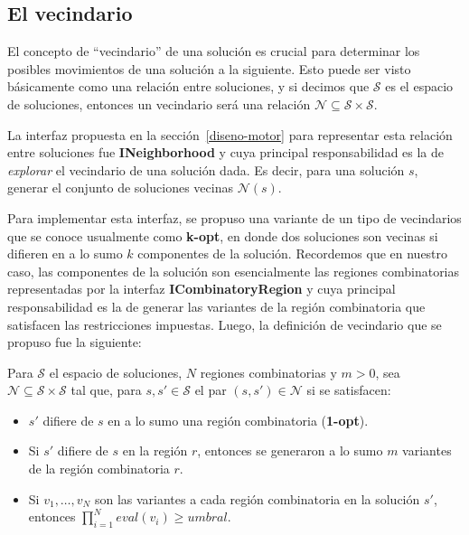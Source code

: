 \subsection{El vecindario}

El concepto de ``vecindario'' de una soluci\'on es crucial para determinar los
posibles movimientos de una soluci\'on a la siguiente. Esto puede ser visto
b\'asicamente como una relaci\'on entre soluciones, y si decimos que
$\mathcal{S}$ es el espacio de soluciones, entonces un vecindario ser\'a una
relaci\'on $\mathcal{N} \subseteq \mathcal{S} \times \mathcal{S}$.

La interfaz propuesta en la secci\'on~\ref{diseno-motor} para representar esta
relaci\'on entre soluciones fue \textbf{INeighborhood} y cuya principal
responsabilidad es la de \textit{explorar} el vecindario de una soluci\'on dada.
Es decir, para una soluci\'on $s$, generar el conjunto de soluciones vecinas
$\mathcal{N}(s)$. 

Para implementar esta interfaz, se propuso una variante de un tipo de
vecindarios que se conoce usualmente como \textbf{k-opt}, en donde dos
soluciones son vecinas si difieren en a lo sumo $k$ componentes de la
soluci\'on. Recordemos que en nuestro caso, las componentes de la soluci\'on son
esencialmente las regiones combinatorias representadas por la interfaz
\textbf{ICombinatoryRegion} y cuya principal responsabilidad es la de generar
las variantes de la regi\'on combinatoria que satisfacen las restricciones
impuestas. Luego, la definici\'on de vecindario que se propuso fue la siguiente:

\begin{definition}
 Para $\mathcal{S}$ el espacio de soluciones, $N$ regiones combinatorias y
$m>0$, sea $\mathcal{N} \subseteq \mathcal{S} \times \mathcal{S}$ tal que,
para $s, s' \in \mathcal{S}$ el par $(s,s') \in \mathcal{N}$ si se satisfacen:
\begin{itemize}
 \item $s'$ difiere de $s$ en a lo sumo una regi\'on combinatoria
(\textbf{1-opt}).
 \item Si $s'$ difiere de $s$ en la regi\'on $r$, entonces se generaron a lo
sumo $m$ variantes de la regi\'on combinatoria $r$.
 \item Si $v_{1}, \dots, v_{N}$ son las variantes a cada regi\'on combinatoria
en la soluci\'on $s'$, entonces $\prod_{i=1}^{N} eval(v_{i}) \ge umbral$.
\end{itemize}
\end{definition}

